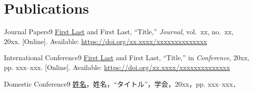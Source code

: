 \chapter*{Publications}

\begin{thepublications}{Journal Papers}{9}
  \underline{First Last} and First Last, ``Title,'' \emph{Journal}, vol.~xx, no.~xx, 20xx. [Online]. Available: \url{https://doi.org/xx.xxxx/xxxxxxxxxxxxxx}
\end{thepublications}

\begin{thepublications}{International Conference}{9}
  \underline{First Last} and First Last, ``Title,'' in \emph{Conference}, 20xx, pp. xxx--xxx. [Online]. Available: \url{https://doi.org/xx.xxxx/xxxxxxxxxxxxxx}
\end{thepublications}

\begin{thepublications}{Domestic Conference}{9}
  \underline{姓名}，姓名，``タイトル''，学会，20xx，pp. xxx--xxx．
\end{thepublications}
